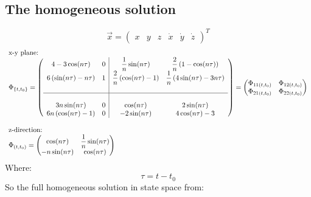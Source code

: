 \documentclass[11pt, a4paper]{article}
\begin{document}
\subsection{The homogeneous solution}
\begin{equation}
    \vec{x} = \begin{pmatrix}
        x & y & z & \dot{x} & \dot{y} & \dot{z}
    \end{pmatrix}^T
\end{equation}
\begin{equation}
    \begin{array}{l}
        \text{x-y plane:} \\
        \Phi_{\left\{t,t_0\right\}} = \left(\begin{array}{cc|cc}
            4-3\cos(n\tau) & 0 &\displaystyle \frac{1}{n}\sin(n\tau) &\displaystyle \frac{2}{n}\left(1-\cos(n\tau)\right) \\ 
            6\left(\sin(n\tau)-n\tau\right) & 1 &\displaystyle \frac{2}{n}\left(\cos(n\tau)-1\right) &\displaystyle \frac{1}{n}\left(4\sin(n\tau)-3n\tau\right)\\ &&& \\ \hline &&& \\
            3n\sin(n\tau) & 0 & \cos(n\tau) & 2\sin(n\tau) \\
            6n\left(\cos(n\tau)-1\right) & 0 & -2\sin(n\tau) & 4\cos(n\tau)-3 
        \end{array}\right) = \begin{pmatrix}
            \Phi_{11(t,t_0)} & \Phi_{12(t,t_0)} \\
            \Phi_{21(t,t_0)} & \Phi_{22(t,t_0)}
        \end{pmatrix} \\ \\
    \text{z-direction:} \\
    \Phi_{(t,t_0)} = \begin{pmatrix}
        \cos(n\tau) & \displaystyle\frac{1}{n}\sin(n\tau) \\
        -n\sin(n\tau) & \cos(n\tau)
    \end{pmatrix}
    \end{array}
\end{equation}
Where:
\begin{equation*}
    \tau = t-t_0
\end{equation*}
So the full homogeneous solution in state space from:
\end{document}
